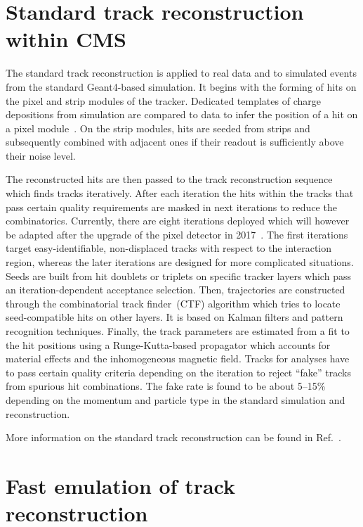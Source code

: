 \documentclass[a4paper]{jpconf}
\begin{document}
\section{Standard track reconstruction within CMS}
The standard track reconstruction is applied to real data and to simulated events from the standard Geant4-based simulation. It begins with the forming of hits on the pixel and strip modules of the tracker. Dedicated templates of charge depositions from simulation are compared to data to infer the position of a hit on a pixel module~\cite{pixelav}. On the strip modules, hits are seeded from strips and subsequently combined with adjacent ones if their readout is sufficiently above their noise level.

The reconstructed hits are then passed to the track reconstruction sequence which finds tracks iteratively. After each iteration the hits within the tracks that pass certain quality requirements are masked in next iterations to reduce the combinatorics. Currently, there are eight iterations deployed which will however be adapted after the upgrade of the pixel detector in 2017~\cite{pixelphase1}. The first iterations target easy-identifiable, non-displaced tracks with respect to the interaction region, whereas the later iterations are designed for more complicated situations. Seeds are built from hit doublets or triplets on specific tracker layers which pass an iteration-dependent acceptance selection. Then, trajectories are constructed through the combinatorial track finder~(CTF) algorithm which tries to locate seed-compatible hits on other layers. It is based on Kalman filters and pattern recognition techniques.  Finally, the track parameters are estimated from a fit to the hit positions using a Runge-Kutta-based propagator which accounts for material effects and the inhomogeneous magnetic field. Tracks for analyses have to pass certain quality criteria depending on the iteration to reject ``fake'' tracks from spurious hit combinations. The fake rate is found to be about 5--15\% depending on the momentum and particle type in the standard simulation and reconstruction.

More information on the standard track reconstruction can be found in Ref.~\cite{trackreco}.


\section{Fast emulation of track reconstruction}
\end{document}
